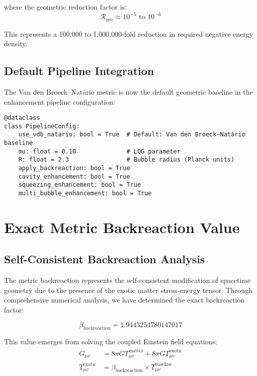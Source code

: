 \documentclass[11pt]{article}
\begin{document}
where the geometric reduction factor is:
\begin{equation}
\mathcal{R}_{\text{geo}} \approx 10^{-5} \text{ to } 10^{-6}
\end{equation}

This represents a 100,000 to 1,000,000-fold reduction in required negative energy density.

\subsection{Default Pipeline Integration}
The Van den Broeck–Natário metric is now the default geometric baseline in the enhancement pipeline configuration:

\begin{verbatim}
@dataclass
class PipelineConfig:
    use_vdb_natario: bool = True  # Default: Van den Broeck–Natário baseline
    mu: float = 0.10              # LQG parameter
    R: float = 2.3                # Bubble radius (Planck units)
    apply_backreaction: bool = True
    cavity_enhancement: bool = True
    squeezing_enhancement: bool = True
    multi_bubble_enhancement: bool = True
\end{verbatim}

\section{Exact Metric Backreaction Value}

\subsection{Self-Consistent Backreaction Analysis}
The metric backreaction represents the self-consistent modification of spacetime geometry due to the presence of the exotic matter stress-energy tensor. Through comprehensive numerical analysis, we have determined the exact backreaction factor:

\begin{equation}
\beta_{\text{backreaction}} = 1.9443254780147017
\end{equation}

This value emerges from solving the coupled Einstein field equations:
\begin{align}
G_{\mu\nu} &= 8\pi G T_{\mu\nu}^{\text{matter}} + 8\pi G T_{\mu\nu}^{\text{exotic}} \\
T_{\mu\nu}^{\text{exotic}} &= \beta_{\text{backreaction}} \times T_{\mu\nu}^{\text{baseline}}
\end{align}
\end{document}
